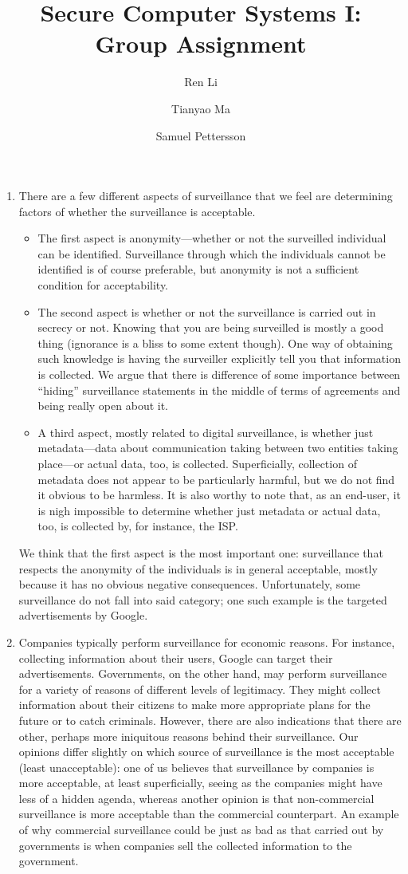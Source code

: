 \documentclass{article}
\title{\textbf{Secure Computer Systems I: Group Assignment}}
\author{Ren Li \and Tianyao Ma \and Samuel Pettersson}
\begin{document}
\maketitle

\begin{enumerate}
\item
There are a few different aspects of surveillance that we feel are determining factors of whether the surveillance is acceptable.
\begin{itemize}
\item
The first aspect is anonymity---whether or not the surveilled individual can be identified. Surveillance through which the individuals cannot be identified is of course preferable, but anonymity is not a sufficient condition for acceptability.
\item
The second aspect is whether or not the surveillance is carried out in secrecy or not. Knowing that you are being surveilled is mostly a good thing (ignorance is a bliss to some extent though). One way of obtaining such knowledge is having the surveiller explicitly tell you that information is collected. We argue that there is difference of some importance between ``hiding'' surveillance statements in the middle of terms of agreements and being really open about it.
\item
A third aspect, mostly related to digital surveillance, is whether just metadata---data about communication taking between two entities taking place---or actual data, too, is collected. Superficially, collection of metadata does not appear to be particularly harmful, but we do not find it obvious to be harmless. It is also worthy to note that, as an end-user, it is nigh impossible to determine whether just metadata or actual data, too, is collected by, for instance, the ISP.
\end{itemize}
We think that the first aspect is the most important one: surveillance that respects the anonymity of the individuals is in general acceptable, mostly because it has no obvious negative consequences. Unfortunately, some surveillance do not fall into said category; one such example is the targeted advertisements by Google.
\item
Companies typically perform surveillance for economic reasons. For instance, collecting information about their users, Google can target their advertisements. Governments, on the other hand, may perform surveillance for a variety of reasons of different levels of legitimacy. They might collect information about their citizens to make more appropriate plans for the future or to catch criminals. However, there are also indications that there are other, perhaps more iniquitous reasons behind their surveillance. Our opinions differ slightly on which source of surveillance is the most acceptable (least unacceptable): one of us believes that surveillance by companies is more acceptable, at least superficially, seeing as the companies might have less of a hidden agenda, whereas another opinion is that non-commercial surveillance is more acceptable than the commercial counterpart. An example of why commercial surveillance could be just as bad as that carried out by governments is when companies sell the collected information to the government.


\end{enumerate}

\end{document}
